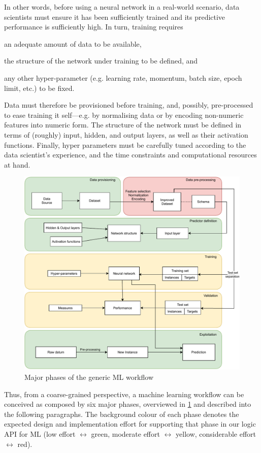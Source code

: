 \documentclass[12pt,a4paper,openright,twoside]{book}
\begin{document}
In other words, before using a neural network in a real-world scenario, data scientists must ensure it has been sufficiently trained and its predictive performance is sufficiently high.
%
In turn, training requires
%
\begin{inlinelist}
    \item an adequate amount of data to be available,
    \item the structure of the network under training to be defined, and
    \item any other hyper-parameter (e.g. learning rate, momentum, batch size, epoch limit, etc.) to be fixed.
\end{inlinelist}
%
Data must therefore be provisioned before training, and, possibly, pre-processed to ease training it self---e.g. by normalising data or by encoding non-numeric features into numeric form.
%
The structure of the network must be defined in terms of (roughly) input, hidden, and output layers, as well as their activation functions.
%
Finally, hyper parameters must be carefully tuned according to the data scientist's experience, and the time constraints and computational resources at hand.
%
\begin{figure}
    \centering
    \includegraphics[width=\linewidth]{figures/phases1.pdf}
    \caption{Major phases of the generic ML workflow}
    \label{fig:activities1}
\end{figure}

Thus, from a coarse-grained perspective, a machine learning workflow can be conceived as composed by six major phases, overviewed in \cref{fig:activities1} and described into the following paragraphs.
%
The background colour of each phase denotes the expected design and implementation effort for supporting that phase in our logic API for ML (low effort $\leftrightarrow$ green, moderate effort $\leftrightarrow$ yellow, considerable effort $\leftrightarrow$ red).
\end{document}
